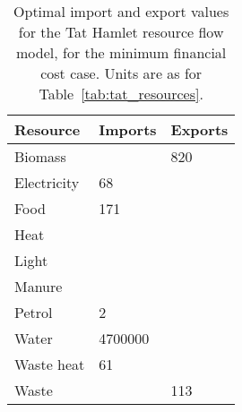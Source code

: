 \begin{table}[h]
	\centering
	\caption{Optimal import and export values for the Tat Hamlet resource flow model, for the minimum financial cost case. Units are as for Table~\ref{tab:tat_resources}.} \label{tab:tat_basic_results}
	\begin{tabular}{lll}
		\toprule
		Resource  & Imports & Exports \\
		\midrule
		Biomass & & 820 \\
		Electricity & 68 & \\
		Food & 171 & \\
		Heat & & \\
		Light & & \\
		Manure & & \\
		Petrol & 2 & \\
		Water & 4700000 & \\
		Waste heat & 61 & \\
		Waste & & 113 \\
		\bottomrule
	\end{tabular}
\end{table}

